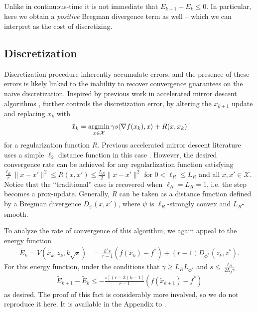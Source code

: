 Unlike in continuous-time it is not immediate that
$E_{k+1} - E_k\leq 0$. In particular, here we obtain a \textit{positive} Bregman divergence term as well -- which we can interpret as the cost of discretizing.

\subsection{Discretization}
Discretization procedure inherently accumulate errors, and the presence of these errors is likely linked to the inability to recover convergence guarantees on the naive discretization. Inspired by previous work in accelerated mirror descent algorithms \citet{nesterov2005smooth, allen2014linear}, \citet{krichene2015accelerated} further controls the discretization error, by altering the $x_{k+1}$ update and replacing $x_k$ with 
\[\tilde x_k = \argmin_{x\in\mathcal X} \gamma s \langle \nabla f(x_k), x \rangle + R(x,x_k)  \]
for a regularization function $R$. Previous accelerated mirror descent literature uses a simple $\ell_2$ distance function in this case \citep{nesterov2005smooth, allen2014linear}. However, the desired convergence rate can be achieved for any regularlization function satisfying $\frac{\ell_R}{r} \|x-x'\|^2 \leq R(x,x') \leq \frac{L_R}{2} \|x-x'\|^2$ for $0<\ell_R\leq L_R$ and all $x,x'\in\mathcal{X}$. Notice that the ``traditional'' case is recovered when $\ell_R=L_R=1$, i.e. the step becomes a prox-update. 
Generally, $R$ can be taken as a distance function defined by a Bregman divergence $D_\psi (x,x')$, where $\psi$ is $\ell_R$-strongly convex and $L_R$-smooth. 

To analyze the rate of convergence of this algorithm, we again appeal to the energy function
\begin{align*}
\tilde E_k = V(\tilde x_k, z_k, k\sqrt{s}) &= \frac{k^2s}{r-1} (f(\tilde x_k) - f^*) + (r-1)D_{\Phi^*}(z_k,z^*).
\end{align*}
For this energy function, under the conditions that $\gamma \geq L_R L_{\Phi^*} $ and $s\leq \frac{\ell_R}{2 L_f \gamma}$
\begin{align}
\label{amdalglyap}
\tilde E_{k+1} - \tilde E_k \leq -\frac{s[(r-3)k-1]}{r-1} (f(\tilde x_{k+1}) - f^*) 
\end{align}
as desired. The proof of this fact is considerably more involved, so we do not reproduce it here. It is available in the Appendix to \citet{krichene2015accelerated}. 

